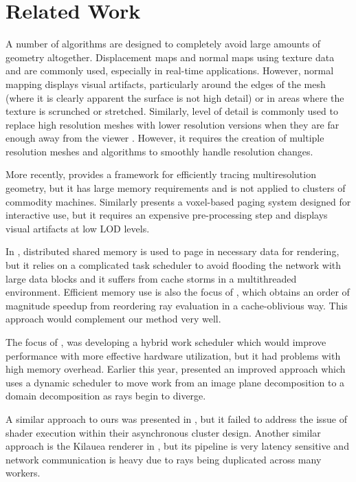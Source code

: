 \documentclass[a4paper,twoside]{article}
\begin{document}
\section{Related Work}
\label{relatedwork}

A number of algorithms are designed to completely avoid large amounts of
geometry altogether. Displacement maps \cite{krishnamurthy:1996} and normal
maps using texture data \cite{cohen:1998} and \cite{cignoni:1998} are commonly
used, especially in real-time applications. However, normal mapping displays
visual artifacts, particularly around the edges of the mesh (where it is clearly
apparent the surface is not high detail) or in areas where the texture is
scrunched or stretched. Similarly, level of detail is commonly used to replace
high resolution meshes with lower resolution versions when they are far enough
away from the viewer \cite{clark:1976}. However, it requires the creation of
multiple resolution meshes and algorithms to smoothly handle resolution changes.

More recently, \cite{djeu:2006} provides a framework for efficiently tracing
multiresolution geometry, but it has large memory requirements and is not
applied to clusters of commodity machines. Similarly \cite{afra:2012} presents
a voxel-based paging system designed for interactive use, but it requires an
expensive pre-processing step and displays visual artifacts at low LOD levels.

In \cite{demarle:2004}, distributed shared memory is used to page in necessary
data for rendering, but it relies on a complicated task scheduler to avoid
flooding the network with large data blocks and it suffers from cache storms in
a multithreaded environment. Efficient memory use is also the focus of
\cite{moon:2010}, which obtains an order of magnitude speedup from reordering
ray evaluation in a cache-oblivious way. This approach would complement our
method very well.

The focus of \cite{reinhard:1999}, was developing a hybrid work scheduler which
would improve performance with more effective hardware utilization, but it had
problems with high memory overhead. Earlier this year, \cite{navratil:2012}
presented an improved approach which uses a dynamic scheduler to move work from
an image plane decomposition to a domain decomposition as rays begin to diverge.

A similar approach to ours was presented in \cite{badouel:1994}, but it failed
to address the issue of shader execution within their asynchronous cluster design.
Another similar approach is the Kilauea renderer in \cite{kato:2002}, but its
pipeline is very latency sensitive and network communication is heavy due to
rays being duplicated across many workers.
\end{document}

